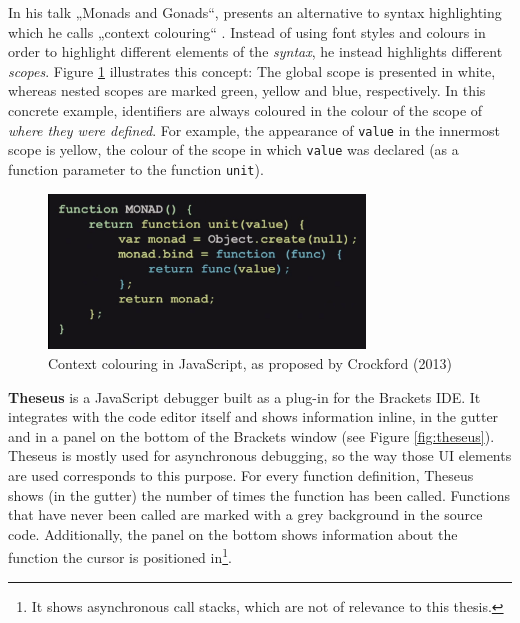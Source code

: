 In his talk „Monads and Gonads“,  presents an
alternative to syntax highlighting which he calls „context colouring“
\citeyear{crockford}. Instead of using font styles and colours in order
to highlight different elements of the \emph{syntax}, he instead
highlights different \emph{scopes}. Figure \ref{fig:contexthighlighting}
illustrates this concept: The global scope is presented in white,
whereas nested scopes are marked green, yellow and blue, respectively.
In this concrete example, identifiers are always coloured in the colour
of the scope of \emph{where they were defined}. For example, the
appearance of \texttt{value} in the innermost scope is yellow, the
colour of the scope in which \texttt{value} was declared (as a function
parameter to the function \texttt{unit}).

\begin{figure}[htbp]
\centering
\includegraphics[keepaspectratio,width=0.75\textwidth]{img/context.png}
\caption{Context colouring in JavaScript, as proposed by Crockford (2013)}
\label{fig:contexthighlighting}
\end{figure}

\textbf{Theseus} is a JavaScript debugger built as a plug-in for the
Brackets IDE. It integrates with the code editor itself and shows
information inline, in the gutter and in a panel on the bottom of the
Brackets window (see Figure \ref{fig:theseus}). Theseus is mostly used
for asynchronous debugging, so the way those UI elements are used
corresponds to this purpose. For every function definition, Theseus
shows (in the gutter) the number of times the function has been called.
Functions that have never been called are marked with a grey background
in the source code. Additionally, the panel on the bottom shows
information about the function the cursor is positioned
in\footnote{It shows asynchronous call stacks, which are not of relevance to this thesis.}.

